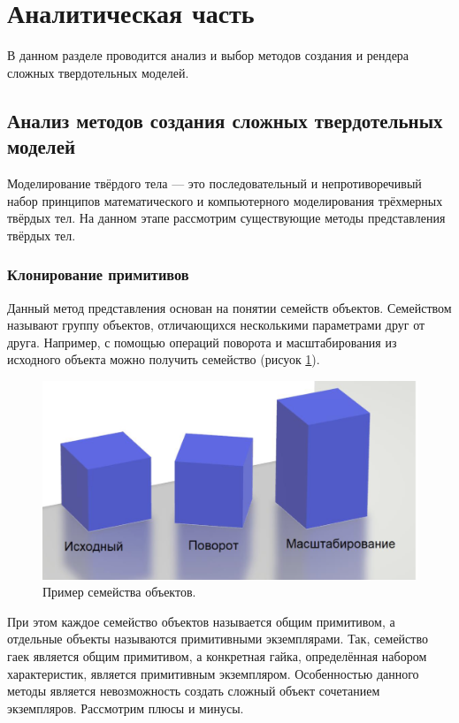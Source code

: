 \section{Аналитическая часть}

В данном разделе проводится анализ и выбор методов создания и рендера 
сложных твердотельных моделей.

\subsection{Анализ методов создания сложных твердотельных моделей}

Моделирование твёрдого тела --- это последовательный и 
непротиворечивый набор принципов математического и компьютерного 
моделирования трёхмерных твёрдых тел. 
На данном этапе рассмотрим 
существующие методы представления твёрдых тел.

\subsubsection{Клонирование примитивов}

Данный метод представления основан на понятии семейств объектов. 
Семейством называют группу объектов, отличающихся несколькими 
параметрами друг от друга. Например, с помощью операций поворота и 
масштабирования из исходного объекта можно получить семейство (рисуок \ref{fig:primitiveClone}).

\begin{figure}[h]
	\centering
	\includegraphics[width=\textwidth]{img/primitiveClone.png}
	\caption{Пример семейства объектов.}
	\label{fig:primitiveClone}
\end{figure}

При этом каждое семейство объектов называется общим примитивом, а 
отдельные объекты называются примитивными экземплярами. 
Так, семейство гаек является общим примитивом, а конкретная гайка, определённая набором характеристик, является примитивным экземпляром.
Особенностью данного методы является невозможность создать сложный 
объект сочетанием экземпляров. 
Рассмотрим плюсы и минусы. 

